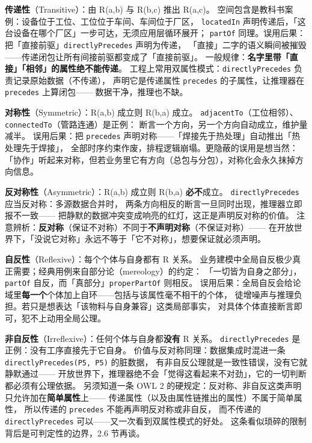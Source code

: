 \textbf{传递性}（Transitive）：由 R(a,b) 与 R(b,c) 推出 R(a,c)。
空间包含是教科书案例：设备位于工位、工位位于车间、车间位于厂区，
\texttt{locatedIn} 声明传递后，「这台设备在哪个厂区」一步可达，无须应用层循环展开；
\texttt{partOf} 同理。误用后果：把「直接前驱」\texttt{directlyPrecedes} 声明为传递，
「直接」二字的语义瞬间被摧毁——传递闭包让所有间接前驱都变成了「直接前驱」。
一般规律：\textbf{名字里带「直接」「相邻」的属性绝不能传递}。
工程上常用双属性模式：\texttt{directlyPrecedes} 负责记录原始数据（不传递），
声明它是传递属性 \texttt{precedes} 的子属性，让推理器在 \texttt{precedes} 上算闭包——
数据干净，推理也不缺。

\textbf{对称性}（Symmetric）：R(a,b) 成立则 R(b,a) 成立。
\texttt{adjacentTo}（工位相邻）、\texttt{connectedTo}（管路连通）是正例：
断言一个方向，另一个方向自动成立，维护量减半。
误用后果：把 \texttt{precedes} 声明对称——「焊接先于热处理」自动推出「热处理先于焊接」，
全部时序约束作废，排程逻辑崩塌。更隐蔽的误用是想当然：
「协作」听起来对称，但若业务里它有方向（总包与分包），对称化会永久抹掉方向信息。

\textbf{反对称性}（Asymmetric）：R(a,b) 成立则 R(b,a) \textbf{必不}成立。
\texttt{directlyPrecedes} 应当反对称：多源数据合并时，
两条方向相反的断言一旦同时出现，推理器立即报不一致——
把静默的数据冲突变成响亮的红灯，这正是声明反对称的价值。
注意辨析：\textbf{反对称}（保证不对称）不同于\textbf{不声明对称}（不保证对称）——
在开放世界下，「没说它对称」永远不等于「它不对称」，想要保证就必须声明。

\textbf{自反性}（Reflexive）：每个个体与自身都有 R 关系。
业务建模中全局自反极少真正需要；经典用例来自部分论（mereology）的约定：
「一切皆为自身之部分」，\texttt{partOf} 自反，而「真部分」\texttt{properPartOf} 则相反。
误用后果：全局自反会给论域里\textbf{每一个}个体加上自环——包括与该属性毫不相干的个体，
徒增噪声与推理负担。若只是想表达「该物料与自身兼容」这类局部事实，
对具体个体直接断言即可，犯不上动用全局公理。

\textbf{非自反性}（Irreflexive）：任何个体与自身都\textbf{没有} R 关系。
\texttt{directlyPrecedes} 是正例：没有工序直接先于它自身。
价值与反对称同理：数据集成时混进一条 \texttt{directlyPrecedes(P5, P5)} 的脏数据，
有非自反公理就是一致性错误，没有它就静默通过——
开放世界下，推理器绝不会「觉得这看起来不对劲」，它的一切判断都必须有公理依据。
另须知道一条 OWL 2 的硬规定：反对称、非自反这类声明只允许加在\textbf{简单属性}上——
传递属性（以及由属性链推出的属性）不属于简单属性，
所以传递的 \texttt{precedes} 不能再声明反对称或非自反，
而不传递的 \texttt{directlyPrecedes} 可以——又一次看到双属性模式的好处。
这条看似琐碎的限制背后是可判定性的边界，2.6 节再谈。

